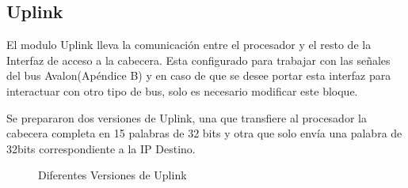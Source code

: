 \subsection{Uplink}
El modulo Uplink lleva la comunicación entre el procesador y el resto de la Interfaz de acceso a la cabecera. Esta configurado para trabajar con las señales del bus Avalon(Apéndice B) y en caso de que se desee portar esta interfaz para interactuar con otro tipo de bus, solo es necesario modificar este bloque.

Se prepararon dos versiones de Uplink, una que transfiere al procesador la cabecera completa en 15 palabras de 32 bits y otra que solo envía una palabra de 32bits correspondiente a la IP Destino. 

\begin{figure}[H]
  \centering

   \hspace{0.1\linewidth}
  \caption{Diferentes Versiones de Uplink }
  \label{fig:up151}
\end{figure}

